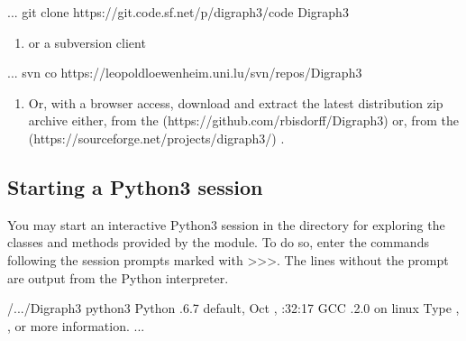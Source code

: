 \documentclass[a4paper,10pt,english]{sphinxhowto}
\begin{document}
\begin{sphinxVerbatim}[commandchars=\\\{\}]
...\PYGZdl{} git clone https://git.code.sf.net/p/digraph3/code Digraph3
\end{sphinxVerbatim}
\begin{enumerate}
%
\setcounter{enumi}{2}
\item {} 
or a subversion client

\end{enumerate}

\begin{sphinxVerbatim}[commandchars=\\\{\}]
...\PYGZdl{} svn co https://leopold\PYGZhy{}loewenheim.uni.lu/svn/repos/Digraph3
\end{sphinxVerbatim}
\begin{enumerate}
%
\setcounter{enumi}{3}
\item {} 
Or, with a browser access, download and extract the latest distribution zip archive either, from the  (https://github.com/rbisdorff/Digraph3)  or, from the  (https://sourceforge.net/projects/digraph3/) .

\end{enumerate}


\subsection{Starting a Python3 session}
\label{\detokenize{tutorial:starting-a-python3-session}}
You may start an interactive Python3 session in the  directory for exploring the classes and methods provided by the  module. To do so, enter the  commands following the session prompts marked with \textgreater{}\textgreater{}\textgreater{}. The lines without the prompt are output from the Python interpreter.

\begin{sphinxVerbatim}[commandchars=\\\{\},numbers=left,firstnumber=1,stepnumber=1]
/.../Digraph3\PYGZdl{} python3
Python .6.7 default, Oct  , :32:17
\PYG{o}{[}GCC .2.0\PYG{o}{]} on linux
Type , ,  or
        more information.
\PYGZgt{}\PYGZgt{}\PYGZgt{} ...
\end{sphinxVerbatim}
\end{document}
